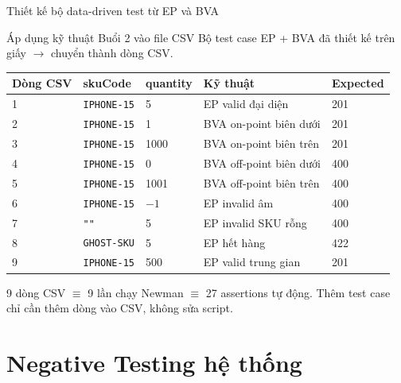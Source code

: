 \documentclass[aspectratio=169,10pt]{beamer}
\begin{document}
\begin{frame}{Thiết kế bộ data-driven test từ EP và BVA}
  \begin{block}{Áp dụng kỹ thuật Buổi 2 vào file CSV}
    Bộ test case EP + BVA đã thiết kế trên giấy $\to$ chuyển thành dòng CSV.
  \end{block}

  \vspace{0.3em}
  \begin{center}
  \scriptsize
  \begin{tabular}{lllll}
    \toprule
    \textbf{Dòng CSV} & \textbf{skuCode} & \textbf{quantity} & \textbf{Kỹ thuật} & \textbf{Expected} \\
    \midrule
    1 & \texttt{IPHONE-15} & 5    & EP valid đại diện      & 201 \\
    2 & \texttt{IPHONE-15} & 1    & BVA on-point biên dưới & 201 \\
    3 & \texttt{IPHONE-15} & 1000 & BVA on-point biên trên & 201 \\
    4 & \texttt{IPHONE-15} & 0    & BVA off-point biên dưới & 400 \\
    5 & \texttt{IPHONE-15} & 1001 & BVA off-point biên trên & 400 \\
    6 & \texttt{IPHONE-15} & $-1$ & EP invalid âm           & 400 \\
    7 & \texttt{""}        & 5    & EP invalid SKU rỗng     & 400 \\
    8 & \texttt{GHOST-SKU} & 5    & EP hết hàng             & 422 \\
    9 & \texttt{IPHONE-15} & 500  & EP valid trung gian     & 201 \\
    \bottomrule
  \end{tabular}
  \end{center}

  \vspace{0.2em}
  {\small 9 dòng CSV $\equiv$ 9 lần chạy Newman $\equiv$ 27 assertions tự động.
  Thêm test case chỉ cần thêm dòng vào CSV, không sửa script.}
\end{frame}

\section{Negative Testing hệ thống}
\end{document}
